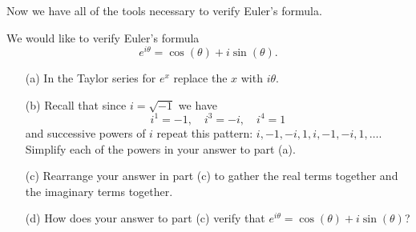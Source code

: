 Now we have all of the tools necessary to verify Euler's formula.  
\begin{problem}
    We would like to verify Euler's formula
    \[ e^{i\theta} = \cos(\theta) + i\sin(\theta). \]
    \begin{enumerate}
        \item[(a)] In the Taylor series for $e^x$ replace the $x$ with $i\theta$.
            \solution{
                \[ e^{i\theta} = 1 + (i\theta) + \frac{(i\theta)^2}{2} +
                    \frac{(i\theta)^3}{3!} + \frac{(i\theta)^4}{4!} +
                    \frac{(i\theta)^5}{5!} + \frac{(i\theta)^6}{6!} +
                    \frac{(i\theta)^7}{7!} \cdots \]
            }
        \item[(b)] Recall that since $i=\sqrt{-1}$ we have
            \[ i^1 = -1, \quad i^3 = -i, \quad i^4 = 1 \]
            and successive powers of $i$ repeat this pattern: $i, -1, -i, 1, i, -1, -i, 1,
            \ldots$.  Simplify each of the powers in your answer to part (a).
            \solution{
                \[ e^{i\theta} = 1 + i\theta - \frac{\theta^2}{2} -
                    i\frac{\theta^3}{3!} + \frac{\theta^4}{4!} + 
                    i\frac{\theta^5}{5!} - \frac{\theta^6}{6!} -
                    i\frac{\theta^7}{7!} \cdots \]
            }
        \item[(c)] Rearrange your answer in part (c) to gather the real terms together and
            the imaginary terms together.
            \solution{
                \[ e^{i\theta} = \left( 1 + - \frac{\theta^2}{2} + \frac{\theta^4}{4!}-
                    \frac{\theta^6}{6!} + \cdots \right) + i\left(  \theta -
                    \frac{\theta^3}{3!} + 
                    \frac{\theta^5}{5!} -
                    \frac{\theta^7}{7!} + \cdots \right) \]
            }
        \item[(d)] How does your answer to part (c) verify that $e^{i\theta} =
            \cos(\theta) + i\sin(\theta)$?
    \end{enumerate}
\end{problem}

